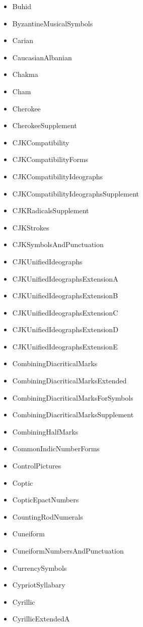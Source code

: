 ﻿\documentclass{article}
\newenvironment{itemlist}{%
  \begin{itemize}
	\setlength{\itemsep}{0pt}
	\setlength{\parsep}{0pt}
	\setlength{\topsep}{0pt}
	\setlength{\partopsep}{0pt}
	\setlength{\parskip}{0pt}
	\setlength{\labelsep}{5pt}}%
{
  \end{itemize}}
\begin{document}
\begin{multicols}{2}
\begin{itemlist}
				\item Buhid
				\item ByzantineMusicalSymbols
				\item Carian
				\item CaucasianAlbanian
				\item Chakma
				\item Cham
				\item Cherokee
				\item CherokeeSupplement
				\item CJKCompatibility
				\item CJKCompatibilityForms
				\item CJKCompatibilityIdeographs
				\item CJKCompatibilityIdeographsSupplement
				\item CJKRadicalsSupplement
				\item CJKStrokes
				\item CJKSymbolsAndPunctuation
				\item CJKUnifiedIdeographs
				\item CJKUnifiedIdeographsExtensionA
				\item CJKUnifiedIdeographsExtensionB
				\item CJKUnifiedIdeographsExtensionC
				\item CJKUnifiedIdeographsExtensionD
				\item CJKUnifiedIdeographsExtensionE
				\item CombiningDiacriticalMarks
				\item CombiningDiacriticalMarksExtended
				\item CombiningDiacriticalMarksForSymbols
				\item CombiningDiacriticalMarksSupplement
				\item CombiningHalfMarks
				\item CommonIndicNumberForms
				\item ControlPictures
				\item Coptic
				\item CopticEpactNumbers
				\item CountingRodNumerals
				\item Cuneiform
				\item CuneiformNumbersAndPunctuation
				\item CurrencySymbols
				\item CypriotSyllabary
				\item Cyrillic
				\item CyrillicExtendedA

\end{itemlist}
\end{multicols}
\end{document}
